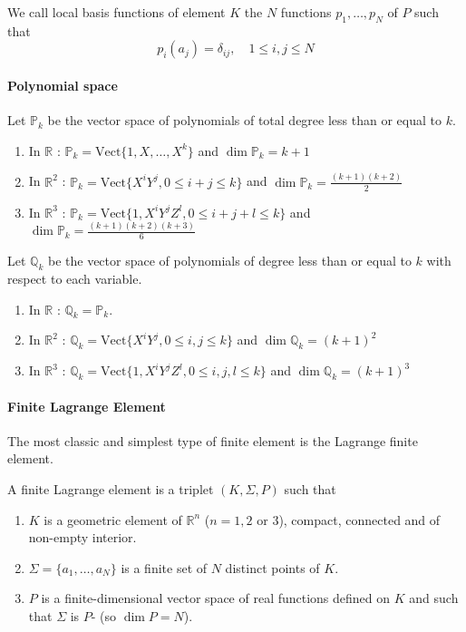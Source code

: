 \begin{Rem}
	We call local basis functions of element $K$ the $N$ functions $p_1,\dots,p_N$ of $P$ such that
	\begin{equation*}
		p_i(a_j)=\delta_{ij},\quad 1\le i,j\le N
	\end{equation*}
\end{Rem}

\paragraph{Polynomial space}

Let $\mathbb{P}_k$ be the vector space of polynomials of total degree less than or equal to $k$.

\begin{enumerate}[label=\textbullet]
	\item In $\mathbb{R}$ : $\mathbb{P}_k=\text{Vect}\{1,X,\dots,X^k\}$ and $\dim\mathbb{P}_k=k+1$ 
	\item In $\mathbb{R}^2$ : $\mathbb{P}_k=\text{Vect}\{X^iY^j,0\le i+j\le k\}$ and $\dim\mathbb{P}_k=\frac{(k+1)(k+2)}{2}$
	\item In $\mathbb{R}^3$ : $\mathbb{P}_k=\text{Vect}\{1,X^iY^jZ^l,0\le i+j+l\le k\}$ and $\dim\mathbb{P}_k=\frac{(k+1)(k+2)(k+3)}{6}$
\end{enumerate}

Let $\mathbb{Q}_k$ be the vector space of polynomials of degree less than or equal to $k$ with respect to each variable.

\begin{enumerate}[label=\textbullet]
	\item In $\mathbb{R}$ : $\mathbb{Q}_k=\mathbb{P}_k$. 
	\item In $\mathbb{R}^2$ : $\mathbb{Q}_k=\text{Vect}\{X^iY^j,0\le i,j\le k\}$ and $\dim\mathbb{Q}_k=(k+1)^2$
	\item In $\mathbb{R}^3$ : $\mathbb{Q}_k=\text{Vect}\{1,X^iY^jZ^l,0\le i,j,l\le k\}$ and $\dim\mathbb{Q}_k=(k+1)^3$
\end{enumerate}

\paragraph{Finite Lagrange Element}

The most classic and simplest type of finite element is the Lagrange finite element.

\begin{Def}
	A finite Lagrange element is a triplet $(K,\Sigma,P)$ such that 
	\begin{enumerate}[label=\textbullet]
		\item $K$ is a geometric element of $\mathbb{R}^n$ ($n=1,2$ or $3$), compact, connected and of non-empty interior.
		\item $\Sigma=\{a_1,\dots,a_N\}$ is a finite set of $N$ distinct points of $K$.
		\item $P$ is a finite-dimensional vector space of real functions defined on $K$ and such that $\Sigma$ is $P$- (so $\dim P=N$).
	\end{enumerate}
\end{Def}

